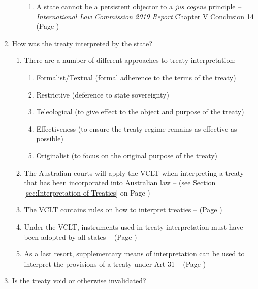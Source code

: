 \begin{enumerate}
\begin{enumerate}
\begin{enumerate}
            \item A state cannot be a persistent objector to a \textit{jus cogens} principle -- \textit{International Law Commission 2019 Report} Chapter V Conclusion 14 (Page \pageref{report:2019 ILC Conc. 14})
        \end{enumerate}
    \end{enumerate}
    \item How was the treaty interpreted by the state?
    \begin{enumerate}
        \item There are a number of different approaches to treaty interpretation:
        \begin{enumerate}
            \item Formalist/Textual (formal adherence to the terms of the treaty)
            \item Restrictive (deference to state sovereignty)
            \item Teleological (to give effect to the object and purpose of the treaty)
            \item Effectiveness (to ensure the treaty regime remains as effective as possible)
            \item Originalist (to focus on the original purpose of the treaty)
        \end{enumerate}
        \item The Australian courts will apply the VCLT when interpreting a treaty that has been incorporated into Australian law --  (see Section \ref{sec:Interpretation of Treaties} on Page \pageref{sec:Interpretation of Treaties})
        \item The VCLT contains rules on how to interpret treaties --  (Page \pageref{VCLT Art 31})
        \item Under the VCLT, instruments used in treaty interpretation must have been adopted by all states --  (Page \pageref{case:Antarctic Whaling})
        \item As a last resort, supplementary means of interpretation can be used to interpret the provisions of a treaty under Art 31 --  (Page \pageref{VCLT Art 32})
    \end{enumerate}
    \item Is the treaty void or otherwise invalidated?
    \begin{enumerate}

\end{enumerate}
\end{enumerate}
